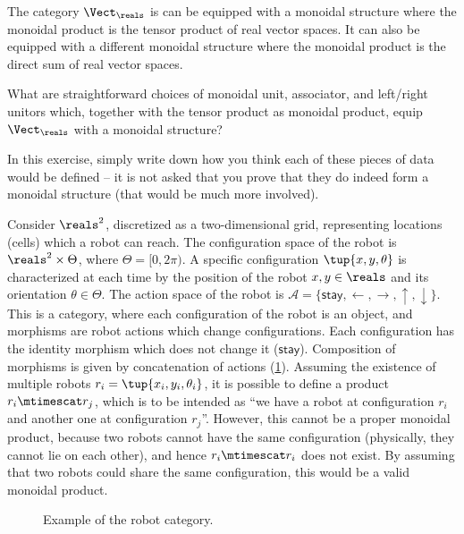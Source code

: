 \begin{example}
The category $\Vect_\reals$ is can be equipped with a monoidal structure where the monoidal product is the tensor product of real vector spaces. It can also be equipped with a different monoidal structure where the monoidal product is the direct sum of real vector spaces.
\end{example}

\begin{gradedexercise}\label{ex:VectTensorMonStructure}
What are straightforward choices of monoidal unit, associator, and left/right unitors which, together with the tensor product as monoidal product, equip $\Vect_\reals$ with a monoidal structure?

In this exercise, simply write down how you think each of these pieces of data would be defined -- it is not asked that you prove that they do indeed form a monoidal structure (that would be much more involved).
\end{gradedexercise}



\begin{example}
  \label{ex:robot}
  Consider $\reals^2$, discretized as a two-dimensional grid, representing locations (cells) which a robot can reach. The configuration space of the robot is $\reals^2\times \Theta$, where $\Theta=[0,2\pi)$. A specific configuration $\tup{x,y,\theta}$ is characterized at each time by the position of the robot $x,y\in \reals$ and its orientation $\theta \in \Theta$. The action space of the robot is $\mathcal{A}=\{\mathsf{stay},\leftarrow, \rightarrow, \uparrow, \downarrow\}$. This is a category, where each configuration of the robot is an object, and morphisms are robot actions which change configurations. Each configuration has the identity morphism which does not change it ($\mathsf{stay}$). Composition of morphisms is given by concatenation of actions (\cref{fig:robotcategory}). Assuming the existence of multiple robots $r_i=\tup{x_i,y_i,\theta_i}$, it is possible to define a product $r_i\mtimescat r_j$, which is to be intended as ``we have a robot at configuration $r_i$ and another one at configuration $r_j$''. However, this cannot be a proper monoidal product, because two robots cannot have the same configuration (physically, they cannot lie on each other), and hence $r_i\mtimescat r_i$ does not exist. By assuming that two robots could share the same configuration, this would be a valid monoidal product.
  \begin{figure}[tbh]
    \begin{center}
    \end{center}
    \caption{Example of the robot category. \label{fig:robotcategory}}
  \end{figure}
\end{example}

